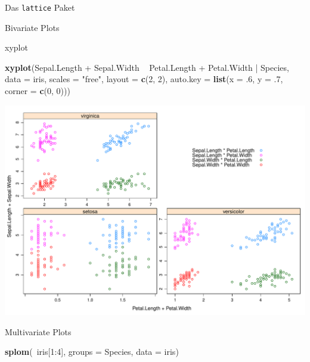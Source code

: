 \documentclass[ignorenonframetext,]{beamer}
\newenvironment{Shaded}{}{}
\newcommand{\KeywordTok}[1]{\textcolor[rgb]{0.00,0.44,0.13}{\textbf{{#1}}}}
\newcommand{\DataTypeTok}[1]{\textcolor[rgb]{0.56,0.13,0.00}{{#1}}}
\newcommand{\DecValTok}[1]{\textcolor[rgb]{0.25,0.63,0.44}{{#1}}}
\newcommand{\StringTok}[1]{\textcolor[rgb]{0.25,0.44,0.63}{{#1}}}
\newcommand{\NormalTok}[1]{{#1}}
\begin{document}
\begin{frame}[fragile]{Das \texttt{lattice} Paket}
\begin{block}{Bivariate Plots}
\end{block}

\begin{block}{xyplot}

\begin{Shaded}
\begin{Highlighting}[]
\KeywordTok{xyplot}\NormalTok{(Sepal.Length +}\StringTok{ }\NormalTok{Sepal.Width ~}\StringTok{ }\NormalTok{Petal.Length +}\StringTok{ }\NormalTok{Petal.Width |}\StringTok{ }\NormalTok{Species,}
       \DataTypeTok{data =} \NormalTok{iris, }\DataTypeTok{scales =} \StringTok{"free"}\NormalTok{, }\DataTypeTok{layout =} \KeywordTok{c}\NormalTok{(}\DecValTok{2}\NormalTok{, }\DecValTok{2}\NormalTok{),}
       \DataTypeTok{auto.key =} \KeywordTok{list}\NormalTok{(}\DataTypeTok{x =} \NormalTok{.}\DecValTok{6}\NormalTok{, }\DataTypeTok{y =} \NormalTok{.}\DecValTok{7}\NormalTok{, }\DataTypeTok{corner =} \KeywordTok{c}\NormalTok{(}\DecValTok{0}\NormalTok{, }\DecValTok{0}\NormalTok{)))}
\end{Highlighting}
\end{Shaded}

\includegraphics{R_intern_files/figure-beamer/unnamed-chunk-228-1.pdf}

\end{block}

\begin{block}{Multivariate Plots}

\begin{Shaded}
\begin{Highlighting}[]
\KeywordTok{splom}\NormalTok{(~iris[}\DecValTok{1}\NormalTok{:}\DecValTok{4}\NormalTok{], }\DataTypeTok{groups =} \NormalTok{Species, }\DataTypeTok{data =} \NormalTok{iris)}
\end{Highlighting}
\end{Shaded}


\end{block}
\end{frame}
\end{document}
